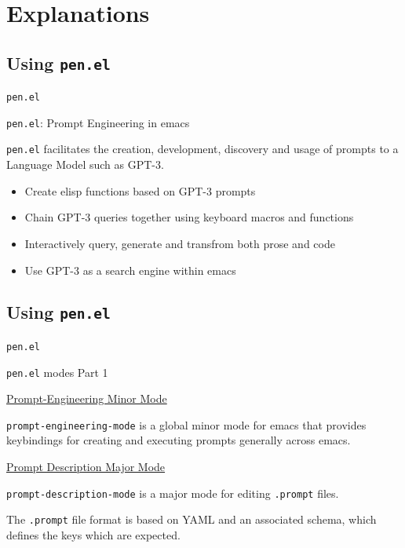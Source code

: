 \documentclass[presentation]{beamer}
\begin{document}
\section{Explanations}
\label{sec:org8845086}
\subsection{Using \texttt{pen.el}}
\label{sec:orgeaf8f64}
\begin{frame}[label={sec:orgd14c461},fragile]{\texttt{pen.el}}
 \begin{block}{\texttt{pen.el}: Prompt Engineering in emacs}
{\footnotesize
\texttt{pen.el} facilitates the creation,
development, discovery and usage of prompts to
a Language Model such as GPT-3.

\begin{itemize}
\item Create elisp functions based on GPT-3 prompts
\item Chain GPT-3 queries together using keyboard macros and functions
\item Interactively query, generate and transfrom both prose and code
\item Use GPT-3 as a search engine within emacs
\end{itemize}
}
\end{block}
\end{frame}

\subsection{Using \texttt{pen.el}}
\label{sec:org514f05f}
\begin{frame}[label={sec:org3cbdf23},fragile]{\texttt{pen.el}}
 \begin{block}{\texttt{pen.el} modes Part 1}
{\footnotesize
\uline{\alert{Prompt-Engineering Minor Mode}}

\texttt{prompt-engineering-mode} is a global minor
mode for emacs that provides keybindings for
creating and executing prompts generally
across emacs.

\uline{\alert{Prompt Description Major Mode}}

\texttt{prompt-description-mode} is a major mode for
editing \texttt{.prompt} files.

The \texttt{.prompt} file format is based on YAML and
an associated schema, which defines the keys
which are expected.
}
\end{block}
\end{frame}
\end{document}
